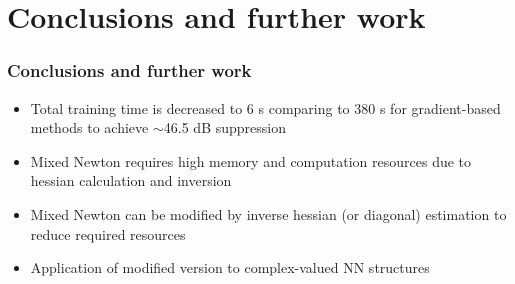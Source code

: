 \documentclass{beamer}
\begin{document}
\section{Conclusions and further work}
\begin{frame}
\frametitle{Conclusions and further work}
\begin{itemize}
\item Total training time is decreased to 6 s comparing to 380 s for gradient-based methods to achieve $\sim$46.5 dB suppression
\item Mixed Newton requires high memory and computation resources due to hessian calculation and inversion
\item Mixed Newton can be modified by inverse hessian (or diagonal) estimation to reduce required resources
\item Application of modified version to complex-valued NN structures

\end{itemize}
\end{frame}
\end{document}
